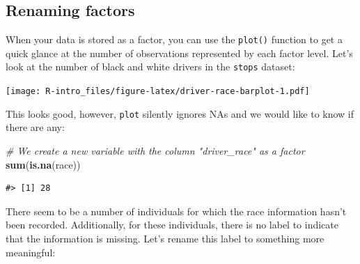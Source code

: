 \documentclass[
]{book}
\newenvironment{Shaded}{\begin{snugshade}}{\end{snugshade}}
\newcommand{\CommentTok}[1]{\textcolor[rgb]{0.56,0.35,0.01}{\textit{#1}}}
\newcommand{\DocumentationTok}[1]{\textcolor[rgb]{0.56,0.35,0.01}{\textbf{\textit{#1}}}}
\newcommand{\FunctionTok}[1]{\textcolor[rgb]{0.13,0.29,0.53}{\textbf{#1}}}
\newcommand{\NormalTok}[1]{#1}
\newcommand{\OtherTok}[1]{\textcolor[rgb]{0.56,0.35,0.01}{#1}}
\newcommand{\SpecialCharTok}[1]{\textcolor[rgb]{0.81,0.36,0.00}{\textbf{#1}}}
\newcommand{\StringTok}[1]{\textcolor[rgb]{0.31,0.60,0.02}{#1}}
\begin{document}
\hypertarget{renaming-factors}{%
\subsection{Renaming factors}\label{renaming-factors}}

When your data is stored as a factor, you can use the \texttt{plot()} function to get a quick glance at the number of observations represented by each factor
level. Let's look at the number of black and white drivers in the \texttt{stops} dataset:

\begin{Shaded}
\end{Shaded}

\texttt{[image: R-intro\_files/figure-latex/driver-race-barplot-1.pdf]}

This looks good, however, \texttt{plot} silently ignores NAs and we would like to know if there are any:

\begin{Shaded}
\begin{Highlighting}[]
\CommentTok{\# We create a new variable with the column "driver\_race" as a factor}
\FunctionTok{sum}\NormalTok{(}\FunctionTok{is.na}\NormalTok{(race))}
\end{Highlighting}
\end{Shaded}

\begin{verbatim}
#> [1] 28
\end{verbatim}

There seem to be a number of individuals for which the race information hasn't been recorded. Additionally, for these individuals, there is no label to indicate that the information is missing. Let's rename this label to something more meaningful:

\begin{Shaded}
\end{Shaded}
\end{document}
